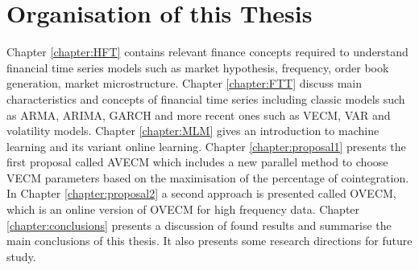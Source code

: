 \section{Organisation of this Thesis}

Chapter \ref{chapter:HFT} contains relevant finance concepts required to understand financial
time series models such as market hypothesis, frequency, order book generation,
market microstructure.
Chapter \ref{chapter:FTT} discuss main characteristics and concepts of financial
time series including classic models such as ARMA, ARIMA,
GARCH and more recent ones such as VECM, VAR and volatility models.
Chapter \ref{chapter:MLM} gives an introduction to machine learning and its
variant online learning. 
Chapter \ref{chapter:proposal1} presents the first proposal called AVECM which
includes a new parallel method to choose VECM parameters based on the maximisation of the
percentage of cointegration.
In Chapter \ref{chapter:proposal2} a second approach is presented called OVECM,
which is an online version of OVECM for high frequency data.
Chapter \ref{chapter:conclusions} presents a discussion of found results and summarise the main
conclusions of this thesis. It also presents some research directions for future
study.


